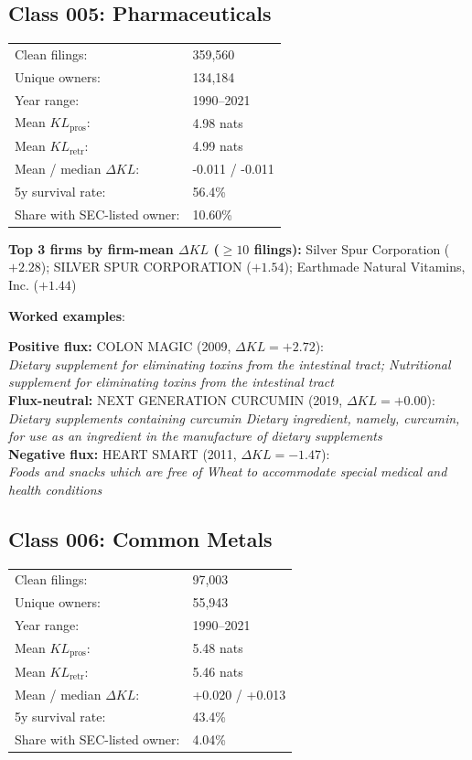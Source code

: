 \subsection*{Class 005: Pharmaceuticals}
\label{app:industry-005}

\begin{tabular}{ll}
Clean filings: & 359,560 \\
Unique owners: & 134,184 \\
Year range: & 1990--2021 \\
Mean $KL_\text{pros}$: & 4.98 nats \\
Mean $KL_\text{retr}$: & 4.99 nats \\
Mean / median $\Delta KL$: & -0.011 / -0.011 \\
5y survival rate: & 56.4\% \\
Share with SEC-listed owner: & 10.60\% \\
\end{tabular}

\textbf{Top 3 firms by firm-mean $\Delta KL$ ($\geq 10$ filings):} Silver Spur Corporation ($+2.28$); SILVER SPUR CORPORATION ($+1.54$); Earthmade Natural Vitamins, Inc. ($+1.44$)

\textbf{Worked examples}:

  \textbf{Positive flux:} \textsc{COLON MAGIC} (2009, $\Delta KL=+2.72$):\\
  \textit{Dietary supplement for eliminating toxins from the intestinal tract; Nutritional supplement for eliminating toxins from the intestinal tract}\\
  \textbf{Flux-neutral:} \textsc{NEXT GENERATION CURCUMIN} (2019, $\Delta KL=+0.00$):\\
  \textit{Dietary supplements containing curcumin Dietary ingredient, namely, curcumin, for use as an ingredient in the manufacture of dietary supplements}\\
  \textbf{Negative flux:} \textsc{HEART SMART} (2011, $\Delta KL=-1.47$):\\
  \textit{Foods and snacks which are free of Wheat to accommodate special medical and health conditions}\\

\subsection*{Class 006: Common Metals}
\label{app:industry-006}

\begin{tabular}{ll}
Clean filings: & 97,003 \\
Unique owners: & 55,943 \\
Year range: & 1990--2021 \\
Mean $KL_\text{pros}$: & 5.48 nats \\
Mean $KL_\text{retr}$: & 5.46 nats \\
Mean / median $\Delta KL$: & +0.020 / +0.013 \\
5y survival rate: & 43.4\% \\
Share with SEC-listed owner: & 4.04\% \\
\end{tabular}

